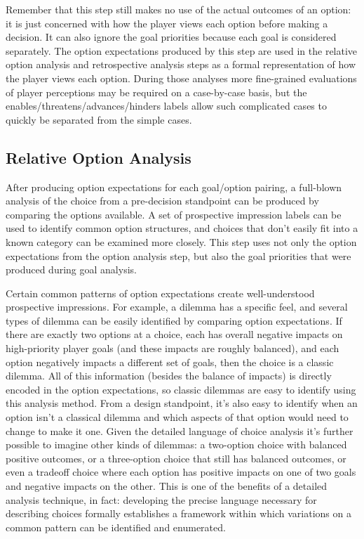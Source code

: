 Remember that this step still makes no use of the actual outcomes of an option: it is just concerned with how the player views each option before making a decision.
%
It can also ignore the goal priorities because each goal is considered separately.
%
The option expectations produced by this step are used in the relative option analysis and retrospective analysis steps as a formal representation of how the player views each option.
%
During those analyses more fine-grained evaluations of player perceptions may be required on a case-by-case basis, but the enables/threatens/advances/hinders labels allow such complicated cases to quickly be separated from the simple cases.


\subsection{Relative Option Analysis}

After producing option expectations for each goal/option pairing, a full-blown analysis of the choice from a pre-decision standpoint can be produced by comparing the options available.
%
A set of prospective impression labels can be used to identify common option structures, and choices that don't easily fit into a known category can be examined more closely.
%
This step uses not only the option expectations from the option analysis step, but also the goal priorities that were produced during goal analysis.


Certain common patterns of option expectations create well-understood prospective impressions.
%
For example, a dilemma has a specific feel, and several types of dilemma can be easily identified by comparing option expectations.
%
If there are exactly two options at a choice, each has overall negative impacts on high-priority player goals (and these impacts are roughly balanced), and each option negatively impacts a different set of goals, then the choice is a classic dilemma.
%
All of this information (besides the balance of impacts) is directly encoded in the option expectations, so classic dilemmas are easy to identify using this analysis method.
%
From a design standpoint, it's also easy to identify when an option isn't a classical dilemma and which aspects of that option would need to change to make it one.
%
Given the detailed language of choice analysis it's further possible to imagine other kinds of dilemmas: a two-option choice with balanced positive outcomes, or a three-option choice that still has balanced outcomes, or even a tradeoff choice where each option has positive impacts on one of two goals and negative impacts on the other.
%
This is one of the benefits of a detailed analysis technique, in fact: developing the precise language necessary for describing choices formally establishes a framework within which variations on a common pattern can be identified and enumerated.


